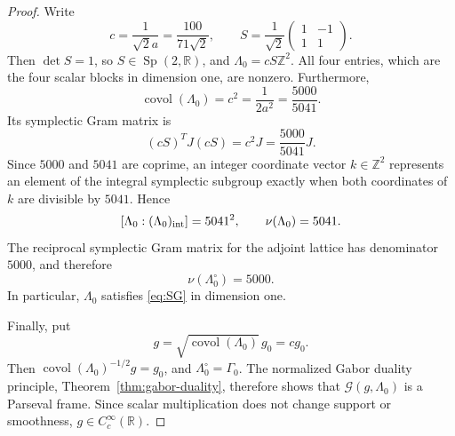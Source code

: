 \documentclass[11pt,reqno]{amsart}
\numberwithin{equation}{section}
\theoremstyle{definition}
\theoremstyle{remark}
\newcommand{\R}{\mathbb R}
\newcommand{\Z}{\mathbb Z}
\newcommand{\covol}{\operatorname{covol}}
\newcommand{\G}{\mathcal G}
\newcommand{\Sp}{\operatorname{Sp}}
\begin{document}
\begin{proof}
Write
\[
 c=\frac1{\sqrt2a}=\frac{100}{71\sqrt2},
 \qquad
 S=\frac1{\sqrt2}\begin{pmatrix}1&-1\\1&1\end{pmatrix}.
\]
Then $\det S=1$, so $S\in\Sp(2,\R)$, and $\Lambda_0=cS\Z^2$.
All four entries, which are the four scalar blocks in dimension one, are
nonzero.  Furthermore,
\[
 \covol(\Lambda_0)=c^2=\frac1{2a^2}=\frac{5000}{5041}.
\]
Its symplectic Gram matrix is
\[
 (cS)^TJ(cS)=c^2J=\frac{5000}{5041}J.
\]
Since $5000$ and $5041$ are coprime, an integer coordinate vector
$k\in\mathbb Z^2$ represents an element of the integral symplectic subgroup
exactly when both coordinates of $k$ are divisible by $5041$.  Hence
\[
 [\Lambda_0:(\Lambda_0)_{\rm int}]=5041^2,
 \qquad
 \nu(\Lambda_0)=5041.
\]
The reciprocal symplectic Gram matrix for the adjoint lattice has denominator
$5000$, and therefore
\[
 \nu(\Lambda_0^\circ)=5000.
\]
In particular, $\Lambda_0$ satisfies \eqref{eq:SG} in dimension one.

Finally, put
\[
 g=\sqrt{\covol(\Lambda_0)}\,g_0=cg_0.
\]
Then
$\covol(\Lambda_0)^{-1/2}g=g_0$, and
$\Lambda_0^\circ=\Gamma_0$.  The normalized Gabor duality principle,
Theorem~\ref{thm:gabor-duality}, therefore shows that
$\G(g,\Lambda_0)$ is a Parseval frame.  Since scalar multiplication does
not change support or smoothness, $g\in C_c^\infty(\R)$.
\end{proof}
\end{document}
